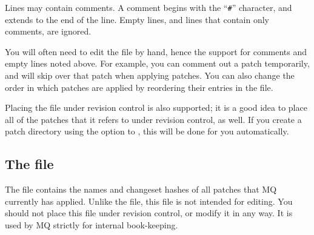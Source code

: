 Lines may contain comments.  A comment begins with the ``\texttt{\#}''
character, and extends to the end of the line.  Empty lines, and lines
that contain only comments, are ignored.

You will often need to edit the  file by hand, hence
the support for comments and empty lines noted above.  For example,
you can comment out a patch temporarily, and  will skip
over that patch when applying patches.  You can also change the order
in which patches are applied by reordering their entries in the
 file.

Placing the  file under revision control is also
supported; it is a good idea to place all of the patches that it
refers to under revision control, as well.  If you create a patch
directory using the  option to , this
will be done for you automatically.

\subsection{The  file}

The  file contains the names and changeset hashes of
all patches that MQ currently has applied.  Unlike the
 file, this file is not intended for editing.  You
should not place this file under revision control, or modify it in any
way.  It is used by MQ strictly for internal book-keeping.


